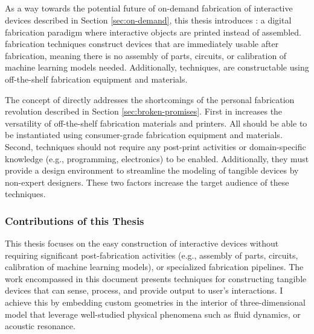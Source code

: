     \subsection{\papf}
      As a way towards the potential future of on-demand fabrication of
      interactive devices described in Section \ref{sec:on-demand}, this thesis
      introduces \papf: a digital fabrication paradigm where interactive objects
      are printed instead of assembled. \pap fabrication techniques construct
      devices that are immediately usable after fabrication, meaning there is no
      assembly of parts, circuits, or calibration of machine learning models
      needed. Additionally, \pap techniques, are constructable using
      off-the-shelf fabrication equipment and materials.

      The concept of \papf directly addresses the shortcomings of the personal
      fabrication revolution described in Section \ref{sec:broken-promises}.
      First in increases the versatility of off-the-shelf fabrication materials
      and printers. All \papf should be able to be instantiated using
      consumer-grade fabrication equipment and materials. Second, \pap
      techniques should not require any post-print activities or domain-specific
      knowledge (e.g., programming, electronics) to be enabled. Additionally,
      they must provide a design environment to streamline the modeling of
      tangible devices by non-expert designers. These two factors increase the
      target audience of these techniques.

      \subsubsection*{Contributions of this Thesis}
        This thesis focuses on the easy construction of interactive devices
        without requiring significant post-fabrication activities (e.g.,
        assembly of parts, circuits, calibration of machine learning models), or
        specialized fabrication pipelines. The work encompassed in this document
        presents techniques for constructing tangible devices that can sense,
        process, and provide output to user's interactions. I achieve this by
        embedding custom geometries in the interior of three-dimensional model
        that leverage well-studied physical phenomena such as fluid dynamics, or
        acoustic resonance.
        

